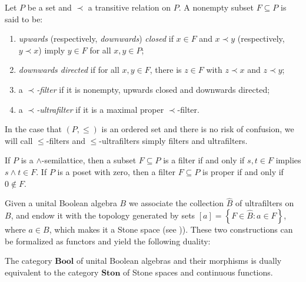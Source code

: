 \begin{definition}\label{definitionfilter}
Let $P$ be a set and $\prec$ a transitive relation on $P$. A nonempty subset $F\subseteq P$ is said to be:
\begin{enumerate}
\item \emph{upwards} (respectively, \emph{downwards}) \emph{closed} if $x\in F$ and $x\prec y$ (respectively, $y\prec x$) imply $y\in F$ for all $x,y\in P$;
\item \emph{downwards directed} if for all $x,y\in F$, there is $z\in F$ with $z\prec x$ and $z\prec y$;
\item a \emph{$\prec$-filter} if it is nonempty, upwards closed and downwards directed;
\item a \emph{$\prec$-ultrafilter} if it is a maximal proper $\prec$-filter.
\end{enumerate}
In the case that $(P,\leq)$ is an ordered set and there is no risk of confusion, we will call $\leq$-filters and $\leq$-ultrafilters simply filters and ultrafilters.
\end{definition}

\begin{remark}\label{remarkfiltermeet}
If $P$ is a $\land$-semilattice, then a subset $F\subseteq P$ is a filter if and only if $s,t\in F$ implies $s\land t\in F$. If $P$ is a poset with zero, then a filter $F\subseteq P$ is proper if and only if $0\not\in F$.
\end{remark}

Given a unital Boolean algebra $B$ we associate the collection $\widehat{B}$ of ultrafilters on $B$, and endow it with the topology generated by sets $[a]=\left\{F\in\widehat{B}:a\in F\right\}$, where $a\in B$, which makes it a Stone space (see \cite{MR1501905})). These two constructions can be formalized as functors and yield the following duality:

\begin{theorem}
The category $\mathbf{Bool}$ of unital Boolean algebras and their morphisms is dually equivalent to the category $\mathbf{Ston}$ of Stone spaces and continuous functions.
\end{theorem}

